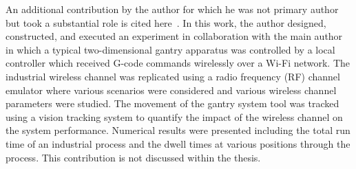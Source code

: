 \documentclass[12pt]{article}
\begin{document}
		An additional contribution by the author for which he was not primary author but took a substantial role is cited here~\cite{MSEC2019-2896}.  In this work, the author designed, constructed, and executed an experiment in collaboration with the main author in which a typical two-dimensional gantry apparatus was controlled by a local controller which received G-code commands wirelessly over a Wi-Fi network. The industrial wireless channel was replicated using a radio frequency (RF) channel emulator where various scenarios were considered and various wireless channel parameters were studied. The movement of the gantry system tool was tracked using a vision tracking system to quantify the impact of the wireless channel on the system performance. Numerical results were presented including the total run time of an industrial process and the dwell times at various positions through the process. This contribution is not discussed within the thesis.
	
		
%		
%		
%		
		
		
	


				
		 

	
	



	
\end{document}
